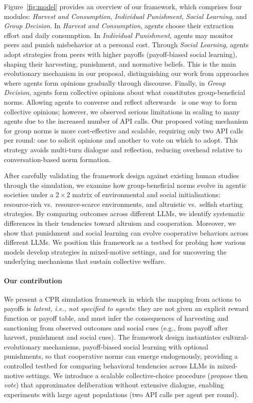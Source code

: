 \documentclass[sigconf]{aamas}
\begin{document}
Figure~\ref{fig:model} provides an overview of our framework, which comprises four modules: \textit{Harvest and Consumption}, \textit{Individual Punishment}, \textit{Social Learning}, and \textit{Group Decision}. 
In \textit{Harvest and Consumption}, agents choose their extraction effort and daily consumption. 
In \textit{Individual Punishment}, agents may monitor peers and punish misbehavior at a personal cost. 
Through \textit{Social Learning}, agents adopt strategies from peers with higher payoffs (payoff-biased social learning), shaping their harvesting, punishment, and normative beliefs. 
This is the main evolutionary mechanism in our proposal, distinguishing our work from approaches where agents form opinions gradually through discourse.
Finally, in \textit{Group Decision}, agents form collective opinions about what constitutes group-beneficial norms.
Allowing agents to converse and reflect afterwards~\cite{piatti2024govsim} is one way to form collective opinions; however, we observed serious limitations in scaling to many agents due to the increased number of API calls. 
Our proposed voting mechanism for group norms is more cost-effective and scalable, requiring only two API calls per round: one to solicit opinions and another to vote on which to adopt.
This strategy avoids multi-turn dialogue and reflection, reducing overhead relative to conversation-based norm formation.


After carefully validating the framework design against existing human studies through the simulation, we examine how group-beneficial norms evolve in agentic societies under a $2\times 2$ matrix of environmental and social initialisations: resource-rich vs.\ resource-scarce environments, and altruistic vs.\ selfish starting strategies. 
By comparing outcomes across different LLMs, we identify systematic differences in their tendencies toward altruism and cooperation.
Moreover, we show that punishment and social learning can evolve cooperative behaviors across different LLMs.
We position this framework as a testbed for probing how various models develop strategies in mixed-motive settings, and for uncovering the underlying mechanisms that sustain collective welfare.

\paragraph{Our contribution}
We present a CPR simulation framework in which the mapping from actions to payoffs is \emph{latent, i.e., not specified to agents}: they are not given an explicit reward function or payoff table, and must infer the consequences of harvesting and sanctioning from observed outcomes and social cues (e.g., from payoff after harvest, punishment and social cues).
The framework design instantiates cultural-evolutionary mechanisms, payoff-biased social learning with optional punishments, so that cooperative norms can emerge endogenously, providing a controlled testbed for comparing behavioral tendencies across LLMs in mixed-motive settings.
We introduce a scalable collective-choice procedure (\emph{propose} then \emph{vote}) that approximates deliberation without extensive dialogue, enabling experiments with large agent populations (two API calls per agent per round). 
\end{document}
